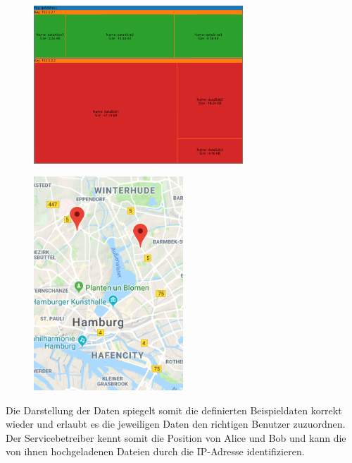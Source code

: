 \documentclass[
    fontsize=12pt,
    headings=small,
    parskip=half,           %
    bibliography=totoc,
    numbers=noenddot,       %
    open=any,               %
    ]{scrreprt}
\begin{document}
\begin{figure}[H]
\includegraphics[width=0.7\textwidth]{../pic/vec/IP-Proxy-SetA-tree3.png}
\label{fig:ungIpTM}
\end{figure}

\begin{figure}[H]
\includegraphics[width=0.5\textwidth , height=0.4\textheight]{../pic/IP-Proxy-SetA.PNG}
\label{fig:ungIpM}
\end{figure}

Die Darstellung der Daten spiegelt somit die definierten Beispieldaten korrekt wieder und erlaubt es die jeweiligen Daten den richtigen Benutzer zuzuordnen. 
Der Servicebetreiber kennt somit die Position von Alice und Bob und kann die von ihnen hochgeladenen Dateien durch die IP-Adresse identifizieren.
\end{document}
